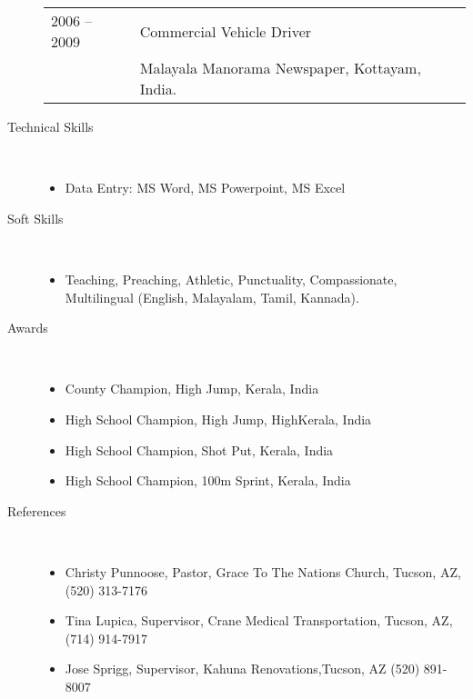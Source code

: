\documentclass[10pt]{article}
\begin{document}
\begin{description}
\begin{tabular}{lp{4.9in}}
\hspace{-.2cm}2006 -- 2009 & Commercial Vehicle Driver  \\\vspace{.1cm}
& {\sc Malayala Manorama Newspaper, Kottayam, India.} \\


\end{tabular}




\item [Technical Skills]  \
\begin{itemize}
\itemsep0em
\item Data Entry:  MS Word, MS Powerpoint, MS Excel
\end{itemize}


\item [Soft Skills]  \
\begin{itemize}
\itemsep0em
\item Teaching, Preaching,  Athletic, Punctuality, Compassionate,  Multilingual (English, Malayalam, Tamil, Kannada).
\end{itemize}


\item [Awards ]  \
\begin{itemize}
\itemsep0em

\item County Champion, High Jump, Kerala, India
\item High School Champion, High Jump, HighKerala, India
\item High School  Champion, Shot Put, Kerala, India
\item High School  Champion, 100m Sprint, Kerala, India
\end{itemize}




\item [References]  \
\begin{itemize}
\itemsep0em
\item Christy Punnoose, Pastor, Grace To The Nations Church, Tucson, AZ, (520) 313-7176
\item Tina Lupica, Supervisor, Crane Medical Transportation, Tucson, AZ, (714) 914-7917
\item Jose Sprigg, Supervisor, Kahuna Renovations,Tucson, AZ (520) 891-8007
\end{itemize}

\end{description}
\end{document}
